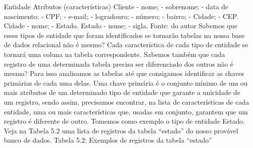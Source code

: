 Entidade	Atributos (características)
Cliente	- nome;
- sobrenome;
- data de nascimento;
- CPF;
- e-mail;
- logradouro;
- número;
- bairro;
- Cidade;
- CEP.
Cidade	- nome;
- Estado.
Estado	- nome;
- sigla.
Fonte: do autor
Sabemos que esses tipos de entidade que foram identificados se tornarão tabelas na nossa base de dados relacional não é mesmo? Cada característica de cada tipo de entidade se tornará uma coluna na tabela correspondente. Sabemos também que cada registro de uma determinada tabela precisa ser diferenciado dos outros não é mesmo? Para isso analisamos as tabelas até que consigamos identificar as chaves primárias de cada uma delas. Uma chave primária é o conjunto mínimo de um ou mais atributos de um determinado tipo de entidade que garante a unicidade de um registro, sendo assim, precisamos encontrar, na lista de características de cada entidade, uma ou mais características que, usadas em conjunto, garantem que um registro é diferente de outro. Tomemos como exemplo o tipo de entidade Estado. Veja na Tabela 5.2 uma lista de registros da tabela “estado” do nosso provável banco de dados.
Tabela 5.2: Exemplos de registros da tabela “estado”

